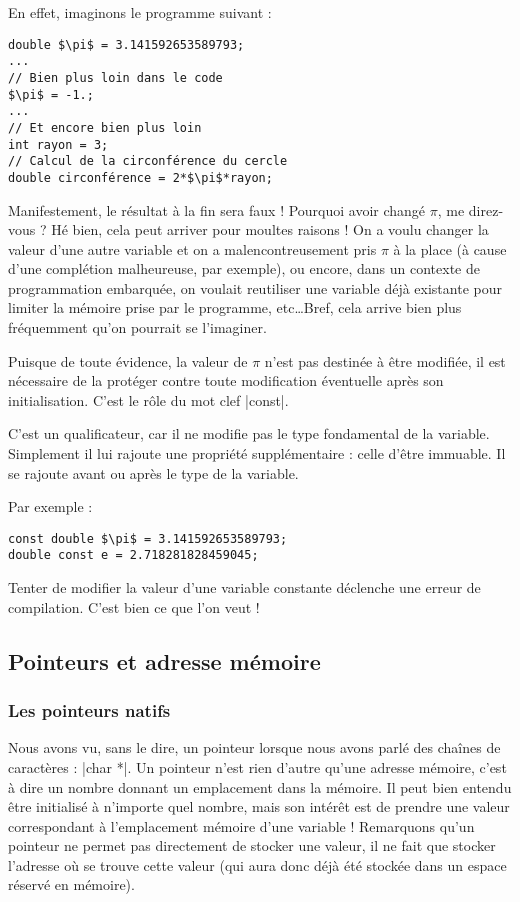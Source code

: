En effet, imaginons le programme suivant :
\begin{lstlisting}[mathescape=true]
double $\pi$ = 3.141592653589793;
...
// Bien plus loin dans le code
$\pi$ = -1.;
...
// Et encore bien plus loin
int rayon = 3;
// Calcul de la circonférence du cercle
double circonférence = 2*$\pi$*rayon;
\end{lstlisting}

Manifestement, le résultat à la fin sera faux ! Pourquoi avoir changé $\pi$, me direz-vous ?
Hé bien, cela peut arriver pour moultes raisons ! On a voulu changer la valeur d'une autre
variable et on a malencontreusement pris $\pi$ à la place (à cause d'une complétion
malheureuse, par exemple), ou encore, dans un contexte de programmation embarquée,
on voulait reutiliser une variable déjà existante pour limiter la mémoire prise par le programme, etc\ldots Bref, cela arrive bien plus fréquemment qu'on pourrait se l'imaginer.

Puisque de toute évidence, la valeur de $\pi$ n'est pas destinée à être modifiée, il est nécessaire de la protéger contre toute modification éventuelle après son initialisation.
C'est le rôle du mot clef |const|.

C'est un qualificateur, car il ne modifie pas le type fondamental de la variable. Simplement il lui rajoute une propriété supplémentaire : celle d'être immuable.
Il se rajoute avant ou après le type de la variable.

Par exemple :
\begin{lstlisting}[mathescape=true]
const double $\pi$ = 3.141592653589793;
double const e = 2.718281828459045;
\end{lstlisting}

Tenter de modifier la valeur d'une variable constante déclenche une erreur de compilation.
C'est bien ce que l'on veut !

\subsection{Pointeurs et adresse mémoire}

\subsubsection{Les pointeurs natifs}

Nous avons vu, sans le dire, un pointeur lorsque nous avons parlé des chaînes de caractères : |char *|.
Un pointeur n'est rien d'autre qu'une adresse mémoire, c'est à dire un nombre donnant un emplacement dans la mémoire. Il peut bien entendu être initialisé à n'importe quel nombre, mais son intérêt est de prendre une valeur correspondant à l'emplacement mémoire d'une variable ! Remarquons qu'un pointeur ne permet pas directement de stocker une valeur, il ne fait que stocker l'adresse où se trouve cette valeur (qui aura donc déjà été stockée dans un espace réservé en mémoire).

